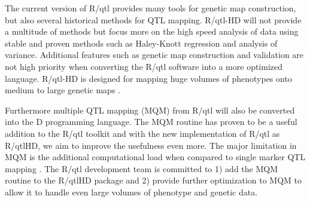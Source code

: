 The current version of R/qtl provides many tools for genetic map construction, but also several historical 
methods for QTL mapping. R/qtl-HD will not provide a multitude of methods but focus more on the high speed 
analysis of data using stable and proven methods such as Haley-Knott regression \cite{Haley:1992} and analysis of variance.
Additional features such as genetic map construction and validation are not high priority when converting 
the R/qtl software into a more optimized language. R/qtl-HD is designed for mapping huge volumes of phenotypes 
onto medium to large genetic maps \cite{Trelles:2011}.

Furthermore multiple QTL mapping (MQM) from R/qtl will also be converted into the D programming language.
The MQM routine has proven to be a useful addition to the R/qtl toolkit and with the new implementation 
of R/qtl as R/qtlHD, we aim to improve the usefulness even more. The major limitation in MQM is the 
additional computational load when compared to single marker QTL mapping \cite{Arends:2010}. The R/qtl 
development team is committed to 1) add the MQM routine to the R/qtlHD package and 2) provide further 
optimization to MQM to allow it to handle even large volumes of phenotype and genetic data. 

